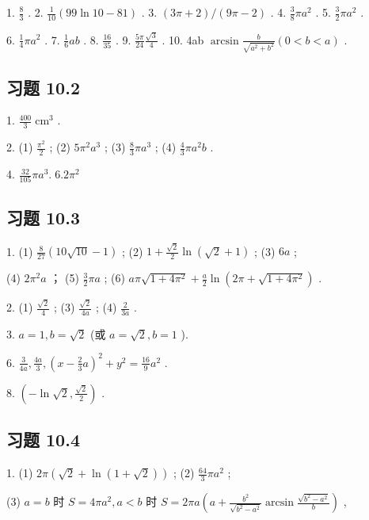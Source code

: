 1. \(\frac{8}{3}\) . 2. \(\frac{1}{10}\left( {{99}\ln {10} - {81}}\right)\) . 3. \(\left( {{3\pi } + 2}\right) /\left( {{9\pi } - 2}\right)\) . 4. \(\frac{3}{8}\pi {a}^{2}\) . 5. \(\frac{3}{2}\pi {a}^{2}\) .

6. \(\frac{1}{4}\pi {a}^{2}\) . 7. \(\frac{1}{6}{ab}\) . 8. \(\frac{16}{35}\) . 9. \(\frac{5\pi }{24}\frac{\sqrt{3}}{4}\) . 10. 4ab \(\arcsin \frac{b}{\sqrt{{a}^{2} + {b}^{2}}}\left( {0 < b < a}\right)\) .

\subsection{习题 10.2}

1. \(\frac{400}{3}{\mathrm{\;{cm}}}^{3}\) .

2. (1) \(\frac{{\pi }^{2}}{2}\) ; (2) \(5{\pi }^{2}{a}^{3}\) ; (3) \(\frac{8}{3}\pi {a}^{3}\) ; (4) \(\frac{4}{3}\pi {a}^{2}b\) .

4. \(\frac{32}{105}\pi {a}^{3}.\;6.2{\pi }^{2}\)

\subsection{习题 10.3}

1. (1) \(\frac{8}{27}\left( {{10}\sqrt{10} - 1}\right)\) ; (2) \(1 + \frac{\sqrt{2}}{2}\ln \left( {\sqrt{2} + 1}\right)\) ; (3) \({6a}\) ;

(4) \(2{\pi }^{2}a\) ； (5) \(\frac{3}{2}{\pi a}\) ; (6) \({a\pi }\sqrt{1 + 4{\pi }^{2}} + \frac{a}{2}\ln \left( {{2\pi } + \sqrt{1 + 4{\pi }^{2}}}\right)\) .

2. (1) \(\frac{\sqrt{2}}{4}\) ; (3) \(\frac{\sqrt{2}}{4a}\) ; (4) \(\frac{2}{3a}\) .

3. \(a = 1,b = \sqrt{2}\) (或 \(a = \sqrt{2},b = 1\) ).

6. \(\frac{3}{4a},\frac{4a}{3},{\left( x - \frac{2}{3}a\right) }^{2} + {y}^{2} = \frac{16}{9}{a}^{2}\) .

8. \(\left( {-\ln \sqrt{2},\frac{\sqrt{2}}{2}}\right)\) .

\subsection{习题 10.4}

1. (1) \({2\pi }\left( {\sqrt{2} + \ln \left( {1 + \sqrt{2}}\right) }\right)\) ; (2) \(\frac{64}{3}\pi {a}^{2}\) ;

(3) \(a = b\) 时 \(S = {4\pi }{a}^{2},a < b\) 时 \(S = {2\pi a}\left( {a + \frac{{b}^{2}}{\sqrt{{b}^{2} - {a}^{2}}}\arcsin \frac{\sqrt{{b}^{2} - {a}^{2}}}{b}}\right)\) ,

